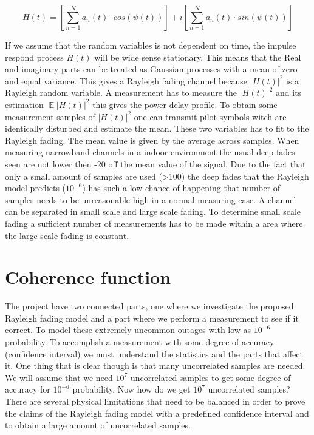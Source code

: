 \begin{equation}
H(t) = \left [ \sum_{n =1}^{N} a_n(t)\cdot cos(\psi (t))\right ] + i\left [\sum_{n =1}^{N} a_n(t)\cdot sin(\psi (t))  \right ]
\end{equation}

If we assume that the random variables is not dependent on time, the impulse respond process $H(t)$ will be wide sense stationary. This means that the Real and imaginary parts can be treated as Gaussian processes with a mean of zero and equal variance. This gives a Rayleigh fading channel because $ \left | H(t) \right |^2 $ is a Rayleigh random variable.
A measurement has to measure the $ \left | H(t) \right |^2 $ and its estimation $ \mathop{\mathbb{E}}\left | H(t) \right |^2 $ this gives the power delay profile. To obtain some measurement samples of $ \left | H(t) \right |^2 $ one can transmit pilot symbols witch are identically disturbed and estimate the mean.\citep{MeasurementComplexRay}
These two variables has to fit to the Rayleigh fading. The mean value is given by the average across samples.
When measuring narrowband channels in a indoor environment the usual deep fades seen are not lower then -20 off the mean value of the signal. Due to the fact that only a small amount of samples are used (>100) the deep fades that the Rayleigh model predicts ($10^{-6}$) has such a low chance of happening that number of samples needs to be unreasonable high in a normal measuring case.
A  channel can be separated in  small scale and large scale fading. To determine small scale fading a sufficient number of measurements has to be made within a area where the large scale fading is constant.



\section{Coherence function}
The project have two connected parts, one where we investigate the proposed Rayleigh fading model and a part where we perform a measurement to see if it correct.  To model these extremely uncommon outages with low as $10^{-6}$ probability. To accomplish a measurement with some degree of accuracy (confidence interval) we must understand the statistics and the parts that affect it. One thing that is clear though is that many uncorrelated samples are needed. We will assume that we need $10^7$ uncorrelated samples to get some degree of accuracy for $10^{-6}$ probability. Now how do we get $10^7$ uncorrelated samples?
There are several physical limitations that need to be balanced  in order to prove the claims of the Rayleigh fading model with a predefined confidence interval and to obtain a large amount of uncorrelated samples.

